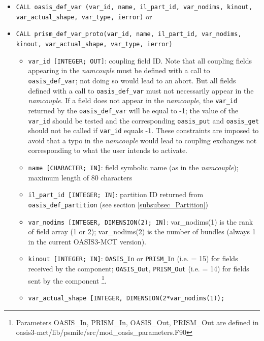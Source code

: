\begin{itemize}

\item {\tt CALL oasis\_def\_var (var\_id, name, il\_part\_id,
    var\_nodims, kinout, \newline var\_actual\_shape, var\_type,
    ierror)} or

\item {\tt CALL prism\_def\_var\_proto(var\_id, name, il\_part\_id,
    var\_nodims, kinout, var\_actual\_shape, var\_type, ierror)}

  \begin{itemize}
  \item {\tt var\_id [INTEGER; OUT]}: coupling field ID.  Note that all 
      coupling fields appearing in the {\it namcouple} must be defined with 
      a call to {\tt oasis\_def\_var}; not doing so would lead to an abort.  
      But all fields defined with a call to {\tt oasis\_def\_var} must not necessarily 
      appear in the {\it namcouple}. If a field does not appear in the {\it namcouple}, 
      the {\tt var\_id} returned by the {\tt oasis\_def\_var} will be equal to -1; 
      the value of the {\tt var\_id} should be tested and the corresponding 
      {\tt oasis\_put} and {\tt oasis\_get} should not be called if {\tt var\_id} 
      equals -1. These constraints are imposed to avoid that a typo in the {\it namcouple}
       would lead to coupling exchanges not corresponding to what the user intends to activate. 
  \item {\tt name [CHARACTER; IN]}: field symbolic name (as in the
    {\it namcouple}); maximum length of 80 characters
  \item {\tt il\_part\_id [INTEGER; IN]}: partition ID returned from {\tt oasis\_def\_partition} (see section
    \ref{subsubsec_Partition})
  \item {\tt var\_nodims [INTEGER, DIMENSION(2); IN]}: var\_nodims(1)
    is the rank of field array (1 or 2); var\_nodims(2) is the number
    of bundles (always 1 in the current OASIS3-MCT version).
  \item {\tt kinout [INTEGER; IN]}: {\tt OASIS\_In} or {\tt PRISM\_In}
    (i.e. = 15) for fields received by the component; {\tt OASIS\_Out},
    {\tt PRISM\_Out} (i.e. = 14) for fields sent by the component
    \footnote{Parameters OASIS\_In, PRISM\_In, OASIS\_Out, PRISM\_Out
      are defined in
      oasis3-mct/lib/psmile/src/mod\_oasis\_parameters.F90}.
  \item {\tt var\_actual\_shape [INTEGER, DIMENSION(2*var\_nodims(1));
}
\end{itemize}
\end{itemize}
